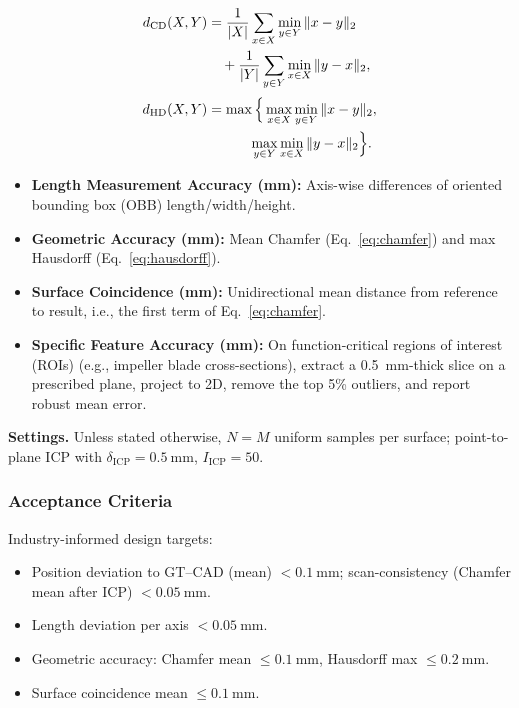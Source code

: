 \documentclass{ieeeaccess}
\begin{document}
\begin{align}
d_{\mathrm{CD}}(X,Y)
  &= \frac{1}{|X|}\sum_{x\in X}\min_{y\in Y}\|x-y\|_2 \notag\\
  &\quad + \frac{1}{|Y|}\sum_{y\in Y}\min_{x\in X}\|y-x\|_2,
  \label{eq:chamfer} 
\\[2pt]
d_{\mathrm{HD}}(X,Y)
  &= \max\Big\{
        \max_{x\in X}\min_{y\in Y}\|x-y\|_2, \notag\\
  &\qquad\quad
        \max_{y\in Y}\min_{x\in X}\|y-x\|_2
     \Big\}.
  \label{eq:hausdorff}
\end{align}


\begin{itemize}
  \item \textbf{Length Measurement Accuracy (mm):} Axis-wise differences of oriented bounding box (OBB) length/width/height.
  \item \textbf{Geometric Accuracy (mm):} Mean Chamfer (Eq.~\eqref{eq:chamfer}) and max Hausdorff (Eq.~\eqref{eq:hausdorff}).
  \item \textbf{Surface Coincidence (mm):} Unidirectional mean distance from reference to result, i.e., the first term of Eq.~\eqref{eq:chamfer}.
  \item \textbf{Specific Feature Accuracy (mm):} On function-critical regions of interest (ROIs) (e.g., impeller blade cross-sections), extract a \SI{0.5}{\milli\meter}-thick slice on a prescribed plane, project to 2D, remove the top 5\% outliers, and report robust mean error.
\end{itemize}
\textbf{Settings.} Unless stated otherwise, \(N=M\) uniform samples per surface; point-to-plane ICP with \(\delta_{\mathrm{ICP}}=\SI{0.5}{\milli\meter}\), \(I_{\mathrm{ICP}}=50\).



\subsubsection{Acceptance Criteria}\label{sec:accept}
Industry-informed design targets:
\begin{itemize}
  \item Position deviation to GT--CAD (mean) $<\SI{0.1}{\milli\meter}$;
        scan-consistency (Chamfer mean after ICP) $<\SI{0.05}{\milli\meter}$.
  \item Length deviation per axis $<\SI{0.05}{\milli\meter}$.
  \item Geometric accuracy: Chamfer mean $\le\SI{0.1}{\milli\meter}$, Hausdorff max $\le\SI{0.2}{\milli\meter}$.
  \item Surface coincidence mean $\le\SI{0.1}{\milli\meter}$.
\end{itemize}
\end{document}
